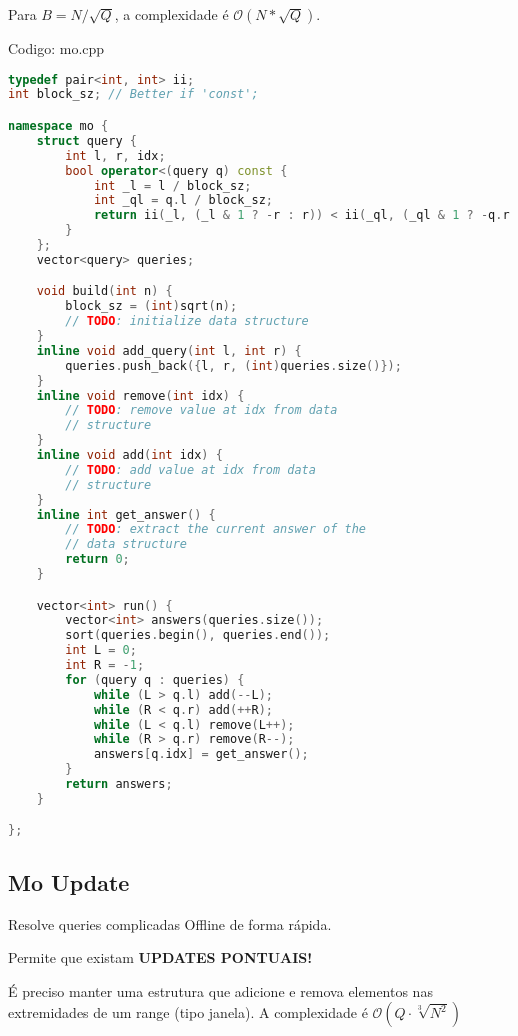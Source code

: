 \documentclass[10pt, a4paper, oneside]{book}
\begin{document}
Para $B = N / \sqrt Q$, a complexidade é $\mathcal{O}(N * \sqrt{Q})$.

\hfill

Codigo: mo.cpp

\begin{lstlisting}[language=C++]
typedef pair<int, int> ii;
int block_sz; // Better if 'const';

namespace mo {
    struct query {
        int l, r, idx;
        bool operator<(query q) const {
            int _l = l / block_sz;
            int _ql = q.l / block_sz;
            return ii(_l, (_l & 1 ? -r : r)) < ii(_ql, (_ql & 1 ? -q.r : q.r));
        }
    };
    vector<query> queries;

    void build(int n) {
        block_sz = (int)sqrt(n);
        // TODO: initialize data structure
    }
    inline void add_query(int l, int r) {
        queries.push_back({l, r, (int)queries.size()});
    }
    inline void remove(int idx) {
        // TODO: remove value at idx from data
        // structure
    }
    inline void add(int idx) {
        // TODO: add value at idx from data
        // structure
    }
    inline int get_answer() {
        // TODO: extract the current answer of the
        // data structure
        return 0;
    }

    vector<int> run() {
        vector<int> answers(queries.size());
        sort(queries.begin(), queries.end());
        int L = 0;
        int R = -1;
        for (query q : queries) {
            while (L > q.l) add(--L);
            while (R < q.r) add(++R);
            while (L < q.l) remove(L++);
            while (R > q.r) remove(R--);
            answers[q.idx] = get_answer();
        }
        return answers;
    }

};
\end{lstlisting}
\hfill

\subsection{Mo Update}


Resolve queries complicadas Offline de forma rápida.   



Permite que existam \textbf{UPDATES PONTUAIS!}  

É preciso manter uma estrutura que adicione e remova elementos nas extremidades de um range (tipo janela). A complexidade é $\mathcal{O}(Q \cdot \sqrt[3]{N^2})$

\hfill
\end{document}
